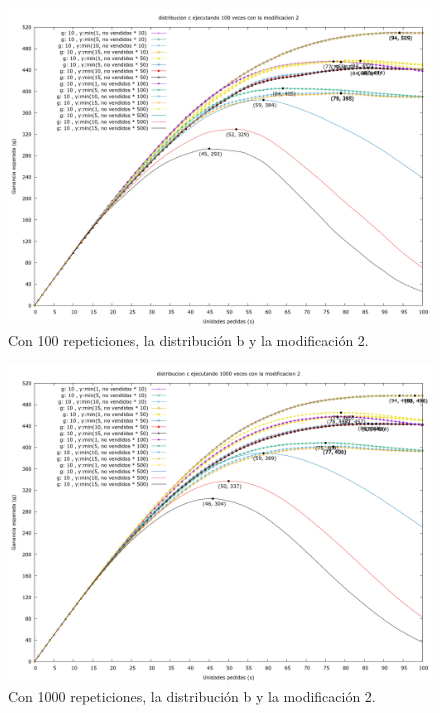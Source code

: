 \documentclass[12pt, spanish]{article}
\begin{document}
\begin{figure}[H]
	\centering
	\includegraphics[scale = 0.3]{prob_c/datos_c_100_2.png}
	\caption{Con 100 repeticiones, la distribución b y la modificación 2.}
	\label{fig:ej1_a_100}

\end{figure}

\begin{figure}[H]
	\centering
	\includegraphics[scale = 0.3]{prob_c/datos_c_1000_2.png}
	\caption{Con 1000 repeticiones, la distribución b y la modificación 2.}
	\label{fig:ej1_a_1000}

\end{figure}
\end{document}
